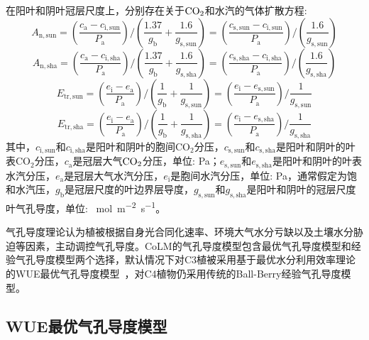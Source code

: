 在阳叶和阴叶冠层尺度上，分别存在关于$\rm CO_2$和水汽的气体扩散方程:
\begin{equation}\label{A_n2_sun}
A_{\mathrm{n,sun}}=\left(\frac{c_{\mathrm{a}}-c_{\mathrm{i,sun}}}{P_{\mathrm {a}}}\right) /\left(\frac{1.37}{g_{\mathrm{b}}} +\frac{1.6}{g_{\mathrm{s,sun}}}\right)=\left(\frac{c_{\mathrm{s,sun}}-c_{\mathrm{i,sun}}}{P_{\mathrm {a}}}\right) /\left(\frac{1.6}{g_{\mathrm{s,sun}}}\right)
\end{equation}
\begin{equation}\label{A_n2_sha}
A_{\mathrm{n,sha}}=\left(\frac{c_{\mathrm{a}}-c_{\mathrm{i,sha}}}{P_{\mathrm {a}}}\right) /\left(\frac{1.37}{g_{\mathrm{b}}} +\frac{1.6}{g_{\mathrm{s,sha}}}\right)=\left(\frac{c_{\mathrm{s,sha}}-c_{\mathrm{i,sha}}}{P_{\mathrm {a}}}\right) /\left(\frac{1.6}{g_{\mathrm{s,sha}}}\right)
\end{equation}
\begin{equation}\label{ea_ei_sun}
E_{\mathrm{tr,sun}}=\left(\frac{e_{\mathrm{i}}-e_{\mathrm{a}}}{P_{\mathrm {a}}}\right) /\left(\frac{1}{g_{\mathrm{b}}}+\frac{1}{g_{\mathrm{s,sun}}}\right)=\left(\frac{e_{\mathrm{i}}-e_{\mathrm{s,sun}}}{P_{\mathrm {a}}}\right) / \frac{1}{g_{\mathrm{s,sun}}}
\end{equation}
\begin{equation}\label{ea_ei_sha}
E_{\mathrm{tr,sha}}=\left(\frac{e_{\mathrm{i}}-e_{\mathrm{a}}}{P_{\mathrm {a}}}\right) /\left(\frac{1}{g_{\mathrm{b}}}+\frac{1}{g_{\mathrm{s,sha}}}\right)=\left(\frac{e_{\mathrm{i}}-e_{\mathrm{s,sha}}}{P_{\mathrm {a}}}\right) / \frac{1}{g_{\mathrm{s,sha}}}
\end{equation}
其中，$c_{\mathrm{i,sun}}$和$c_{\mathrm{i,sha}}$是阳叶和阴叶的胞间CO$_2$分压，$c_{\mathrm{s,sun}}$和$c_{\mathrm{s,sha}}$是阳叶和阴叶的叶表CO$_2$分压，$c_{\mathrm {a}}$是冠层大气$\rm CO_2$分压，单位: Pa；$e_{\mathrm{s,sun}}$和$e_{\mathrm{s,sha}}$是阳叶和阴叶的叶表水汽分压，$e_{\mathrm {a}}$是冠层大气水汽分压，$e_{\mathrm {i}}$是胞间水汽分压，单位: Pa，通常假定为饱和水汽压，$g_{\mathrm {b}}$是冠层尺度的叶边界层导度，$g_{\mathrm{s,sun}}$和$g_{\mathrm{s,sha}}$是阳叶和阴叶的冠层尺度叶气孔导度，单位: \unit{\mu mol.m^{-2}.s^{-1}}。

气孔导度理论认为植被根据自身光合同化速率、环境大气水分亏缺以及土壤水分胁迫等因素，主动调控气孔导度。CoLM的气孔导度模型包含最优气孔导度模型和经验气孔导度模型两个选择，默认情况下对C3植被采用基于最优水分利用效率理论的WUE最优气孔导度模型~\citep{Liang2023}，对C4植物仍采用传统的Ball-Berry经验气孔导度模型。

\subsection{WUE最优气孔导度模型}

